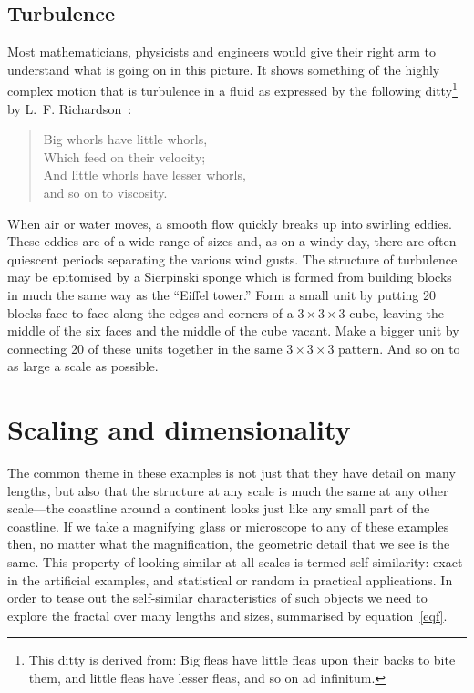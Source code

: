 \documentclass[11pt,a4paper]{article}
\begin{document}
\subsection{Turbulence}
\label{ssturb}

Most mathematicians, physicists and engineers would give their right 
arm to understand what is going on in this picture.  It shows 
something of the highly complex motion that is turbulence in a fluid 
as expressed by the following ditty\footnote{This ditty is derived 
from: Big fleas have little fleas upon their backs to bite them, and 
little fleas have lesser fleas, and so on ad infinitum.} by 
L.~F. Richardson~\cite{Rich}:
\begin{verse}
	Big whorls have little whorls,\\
	Which feed on their velocity;\\
	And little whorls have lesser whorls,\\
	and so on to viscosity.
\end{verse}

When air or water moves, a smooth flow quickly breaks up into 
swirling eddies.  These eddies are of a wide range of sizes and, as 
on a windy day, there are often quiescent periods separating the 
various wind gusts.  The structure of turbulence may be epitomised by 
a Sierpinski sponge which is formed from building blocks in much the 
same way as the ``Eiffel tower.''  Form a small unit by putting 20 
blocks face to face along the edges and corners of a $3\times 
3\times 3$ cube, 
leaving the middle of the six faces and the middle of the cube 
vacant.  Make a bigger unit by connecting 20 of these units together 
in the same 
\(
	3\times 3\times 3
\)
 pattern.  And so on to as large a scale as possible.
 
 

\section{Scaling and dimensionality}
\label{sdim}

The common theme in these examples is not just that they have detail 
on many lengths, but also that the structure at any scale is much the 
same at any other scale---the coastline around a continent looks just 
like any small part of the coastline.  If we take a magnifying glass 
or microscope to any of these examples then, no matter what the 
magnification, the geometric detail that we see is the same.  This 
property of looking similar at all scales is termed self-similarity: 
exact in the artificial examples, and statistical or random in 
practical applications.  In order to tease out the self-similar 
characteristics of such objects we need to explore the fractal over 
many lengths and sizes, summarised by equation~\cref{eqf}.  
\end{document}
